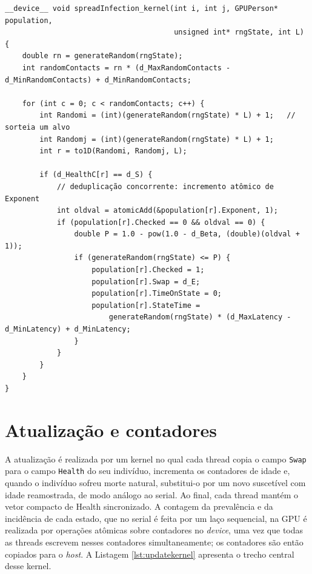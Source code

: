 \begin{lstlisting}[caption={Segundo mecanismo: deduplicação concorrente por operação atômica.}, label={lst:spread}]
__device__ void spreadInfection_kernel(int i, int j, GPUPerson* population,
                                       unsigned int* rngState, int L) {
    double rn = generateRandom(rngState);
    int randomContacts = rn * (d_MaxRandomContacts - d_MinRandomContacts) + d_MinRandomContacts;

    for (int c = 0; c < randomContacts; c++) {
        int Randomi = (int)(generateRandom(rngState) * L) + 1;   // sorteia um alvo
        int Randomj = (int)(generateRandom(rngState) * L) + 1;
        int r = to1D(Randomi, Randomj, L);

        if (d_HealthC[r] == d_S) {
            // deduplicação concorrente: incremento atômico de Exponent
            int oldval = atomicAdd(&population[r].Exponent, 1);
            if (population[r].Checked == 0 && oldval == 0) {
                double P = 1.0 - pow(1.0 - d_Beta, (double)(oldval + 1));
                if (generateRandom(rngState) <= P) {
                    population[r].Checked = 1;
                    population[r].Swap = d_E;
                    population[r].TimeOnState = 0;
                    population[r].StateTime =
                        generateRandom(rngState) * (d_MaxLatency - d_MinLatency) + d_MinLatency;
                }
            }
        }
    }
}
\end{lstlisting}

\section{Atualização e contadores}

A atualização é realizada por um kernel no qual cada thread copia o campo \texttt{Swap} para o campo \texttt{Health} do seu indivíduo, incrementa os contadores de idade e, quando o indivíduo sofreu morte natural, substitui-o por um novo suscetível com idade reamostrada, de modo análogo ao serial. Ao final, cada thread mantém o vetor compacto de Health sincronizado. A contagem da prevalência e da incidência de cada estado, que no serial é feita por um laço sequencial, na GPU é realizada por operações atômicas sobre contadores no \textit{device}, uma vez que todas as threads escrevem nesses contadores simultaneamente; os contadores são então copiados para o \textit{host}. A Listagem \ref{lst:updatekernel} apresenta o trecho central desse kernel.

